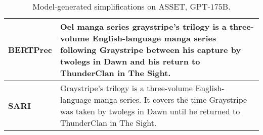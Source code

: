 \documentclass[11pt]{article}
\begin{document}
\begin{table*}[t]
\begin{tabular}{@{}lp{}@{}}
\hline
{\bf BERTPrec}      & Oel manga series graystripe's trilogy is a three-volume English-language manga series following Graystripe between his capture by twolegs in Dawn and his return to ThunderClan in The Sight.\\
\hline
{\bf SARI}      & Graystripe's trilogy is a three-volume \textcolor{Mycolor3}{English-language} manga series. It covers the time Graystripe was taken by twolegs in Dawn until he returned to ThunderClan in The Sight.
\\
\bottomrule
\end{tabular}
\caption{Model-generated simplifications on ASSET, GPT-$175$B.}
\label{tab:examples}
\end{table*}
\end{document}
